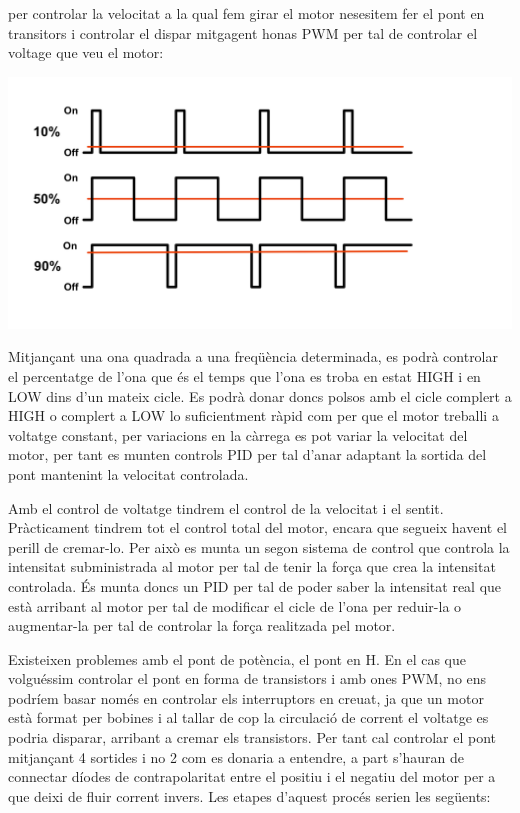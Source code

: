 per controlar la velocitat a la qual fem girar el motor nesesitem fer el pont en transitors i controlar el dispar mitgagent honas PWM per tal de controlar el voltage que veu el motor: \smallskip

\includegraphics[width=\textwidth]{Motors/PWM}

Mitjançant una ona quadrada a una freqüència determinada, es podrà controlar el percentatge de l'ona que és el temps que l'ona es troba en estat HIGH i en LOW dins d'un mateix cicle. Es podrà donar doncs polsos amb el cicle complert a HIGH o complert a LOW lo suficientment ràpid com per que el motor treballi a voltatge constant, per variacions en la càrrega es pot variar la velocitat del motor, per tant es munten controls PID per tal d'anar adaptant la sortida del pont mantenint la velocitat controlada.

Amb el control de voltatge tindrem el control de la velocitat i el sentit. Pràcticament tindrem tot el control total del motor, encara que segueix havent el perill de cremar-lo. Per això es munta un segon sistema de control que controla la intensitat subministrada al motor per tal de tenir la força que crea la intensitat controlada. És munta doncs un PID per tal de poder saber la intensitat real que està arribant al motor per tal de modificar el cicle de l'ona per reduir-la o augmentar-la per tal de controlar la força realitzada pel motor.

Existeixen problemes amb el pont de potència, el pont en H. En el cas que volguéssim controlar el pont en forma de transistors i amb ones PWM, no ens podríem basar només en controlar els interruptors en creuat, ja que un motor està format per bobines i al tallar de cop la circulació de corrent el voltatge es podria disparar, arribant a cremar els transistors. Per tant cal controlar el pont mitjançant 4 sortides i no 2 com es donaria a entendre, a part s'hauran de connectar díodes de contrapolaritat entre el positiu i el negatiu del motor per a que deixi de fluir corrent invers. Les etapes d'aquest procés serien les següents:


